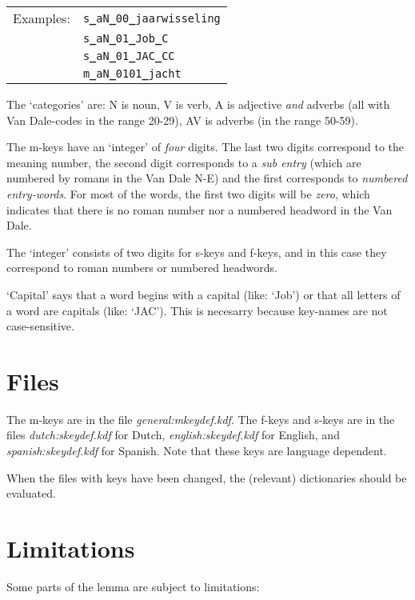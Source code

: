 \begin{tabular}{ll}
Examples:  & {\tt s{\bf\_}aN{\bf\_}00{\bf\_}jaarwisseling} \\
           & {\tt s{\bf\_}aN{\bf\_}01{\bf\_}Job{\bf\_}C} \\
           & {\tt s{\bf\_}aN{\bf\_}01{\bf\_}JAC{\bf\_}CC} \\
           & {\tt m{\bf\_}aN{\bf\_}0101{\bf\_}jacht} \\
\end{tabular}

The `categories' are: N is noun, V is verb, A is adjective {\em and} adverbs (all
with Van Dale-codes in the range 20-29), AV is adverbs (in the range 50-59).

The m-keys have an `integer' of {\em four} digits. The last two digits 
correspond to the meaning number, the second digit corresponds 
to a {\em sub entry} (which are numbered by romans in the Van Dale N-E) 
and the first corresponds to {\em numbered
entry-words}. For most of the words, the first two digits will be {\em zero}, 
which indicates that there is no roman number nor a numbered headword in the 
Van Dale.

The `integer' consists of two digits for s-keys and f-keys, and in this case
they correspond to roman numbers or numbered headwords.

`Capital' says that a word begins with a capital (like: `Job') or that all
letters of a word are capitals (like: `JAC'). This is necesarry because
key-names are not case-sensitive.

\section{Files}

The m-keys are in the file {\em general:mkeydef.kdf}.
The f-keys and s-keys are in the files {\em dutch:skeydef.kdf} for Dutch,
{\em english:skeydef.kdf} for English, and {\em spanish:skeydef.kdf} for 
Spanish. Note that these keys are language dependent.

When the files with keys have been changed, the (relevant) dictionaries should
be evaluated.

\section{Limitations}

Some parts of the lemma are subject to limitations:

